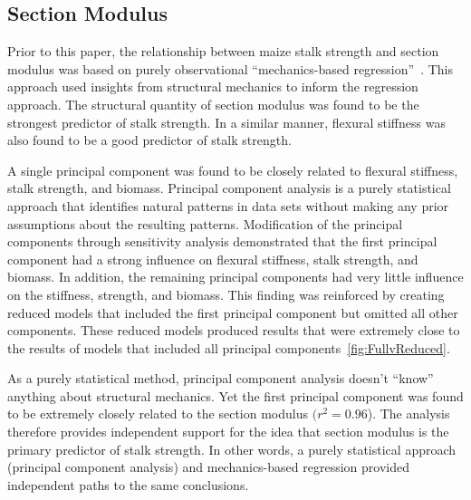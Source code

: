 \subsection{Section Modulus}
\label{ssec:section_modulus}
Prior to this paper, the relationship between maize stalk strength and section modulus was based on purely observational “mechanics-based regression”~. This approach used insights from structural mechanics to inform the regression approach. The structural quantity of section modulus was found to be the strongest predictor of stalk strength. In a similar manner, flexural stiffness was also found to be a good predictor of stalk strength. 

A single principal component was found to be closely related to flexural stiffness, stalk strength, and biomass. Principal component analysis is a purely statistical approach that identifies natural patterns in data sets without making any prior assumptions about the resulting patterns. Modification of the principal components through sensitivity analysis demonstrated that the first principal component had a strong influence on flexural stiffness, stalk strength, and biomass. In addition, the remaining principal components had very little influence on the stiffness, strength, and biomass. This finding was reinforced by creating reduced models that included the first principal component but omitted all other components. These reduced models produced results that were extremely close to the results of models that included all principal components~\cref{fig:FullvReduced}. 

As a purely statistical method, principal component analysis doesn’t “know” anything about structural mechanics.  Yet the first principal component was found to be extremely closely related to the section modulus ${(r^{2} = 0.96}$).  The analysis therefore provides independent support for the idea that section modulus is the primary predictor of stalk strength. In other words, a purely statistical approach (principal component analysis) and mechanics-based regression provided independent paths to the same conclusions. 

